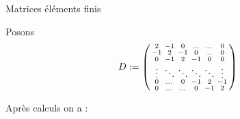 \documentclass[10pt]{beamer}
\begin{document}


\begin{frame}{Matrices éléments finis}

\noindent Posons 
$$
D := \begin{psmallmatrix}
2 & -1 & 0 &\dots & \dots &0   \\
-1 & 2 & -1 &0 & \dots &0   \\
 0 & -1 & 2 & -1 & 0 & 0    \\
\vdots  &  \ddots & \ddots  & \ddots & \ddots & \vdots \\
0  & \dots & 0  &-1 & 2 &-1 \\
0  &  \dots & \dots   &0 & -1 &2 
\end{psmallmatrix} 
$$


\noindent Après calculs on a :

\noindent%
\begin{minipage}{.35\textwidth}%


\end{minipage}
\end{frame}
\end{document}
